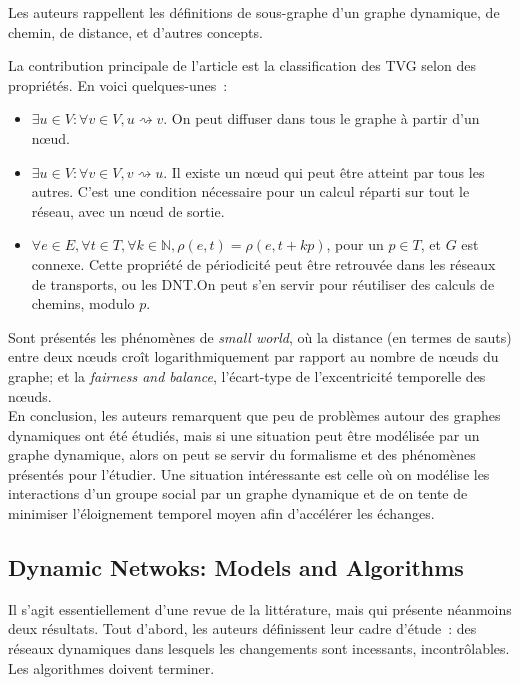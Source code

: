 \documentclass[12pt,a4paper]{article}
\begin{document}
Les auteurs rappellent les définitions de sous-graphe d'un graphe
dynamique, de chemin, de distance, et d'autres concepts.

La contribution principale de l'article est la classification des TVG
selon des propriétés. En voici quelques-unes~:

\begin{itemize}
\item \(\exists u \in V : \forall v \in V, u \rightsquigarrow v\). On
  peut diffuser dans tous le graphe à partir d'un nœud.
\item \(\exists u \in V : \forall v \in V, v \rightsquigarrow u\). Il
  existe un nœud qui peut être atteint par tous les autres. C'est une
  condition nécessaire pour un calcul réparti sur tout le réseau, avec
  un nœud de sortie.
\item
  \(\forall e \in E, \forall t \in T, \forall k \in \mathbb{N},
  \rho(e, t) = \rho(e, t + kp)\), pour un \(p \in T\), et \(G\) est
  connexe. Cette propriété de périodicité peut être retrouvée dans les
  réseaux de transports, ou les DNT.\@ On peut s'en servir pour
  réutiliser des calculs de chemins, modulo \(p\).
\end{itemize}

Sont présentés les phénomènes de \textit{small world}, où la distance
(en termes de sauts) entre deux nœuds croît logarithmiquement par
rapport au nombre de nœuds du graphe; et la \textit{fairness and
  balance}, l'écart-type de l'excentricité temporelle des nœuds.\\

En conclusion, les auteurs remarquent que peu de problèmes autour des
graphes dynamiques ont été étudiés, mais si une situation peut être
modélisée par un graphe dynamique, alors on peut se servir du
formalisme et des phénomènes présentés pour l'étudier. Une situation
intéressante est celle où on modélise les interactions d'un groupe
social par un graphe dynamique et de on tente de minimiser
l'éloignement temporel moyen afin d'accélérer les échanges.

\subsection{Dynamic Netwoks: Models and
  Algorithms~\cite{kuhn2011dynamic}}

Il s'agit essentiellement d'une revue de la littérature, mais qui
présente néanmoins deux résultats. Tout d'abord, les auteurs
définissent leur cadre d'étude~: des réseaux dynamiques dans lesquels
les changements sont incessants, incontrôlables. Les algorithmes
doivent terminer.
\end{document}
